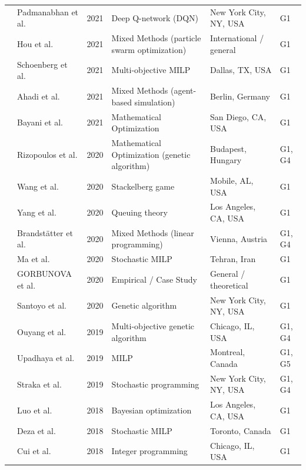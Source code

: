 \documentclass[letterpaper, 12pt, oneside, doublespacing]{Thesis}
\begin{document}
\begin{longtable}{L{0.9cm} L{2.2cm} L{0.8cm} L{3.3cm} L{2.5cm} L{1.5cm}}
\cite{optimal_placement_2021} & Padmanabhan et al. & 2021 & Deep Q-network (DQN) & New York City, NY, USA & G1 \\
\cite{optimal_planning_2021} & Hou et al. & 2021 & Mixed Methods (particle swarm optimization) & International {\slash} general & G1 \\
\cite{reducing_waiting_2021} & Schoenberg et al. & 2021 & Multi-objective MILP & Dallas, TX, USA & G1 \\
\cite{siting_and_2021} & Ahadi et al. & 2021 & Mixed Methods (agent-based simulation) & Berlin, Germany & G1 \\
\cite{strategic_competition_2021} & Bayani et al. & 2021 & Mathematical Optimization & San Diego, CA, USA & G1 \\
\cite{a_method_2020} & Rizopoulos et al. & 2020 & Mathematical Optimization (genetic algorithm) & Budapest, Hungary & G1, G4 \\
\cite{double-layer_game_2020} & Wang et al. & 2020 & Stackelberg game & Mobile, AL, USA & G1 \\
\cite{dynamic_modeling_2020} & Yang et al. & 2020 & Queuing theory & Los Angeles, CA, USA & G1 \\
\cite{location_of_2020} & Brandst\"atter et al. & 2020 & Mixed Methods (linear programming) & Vienna, Austria & G1, G4 \\
\cite{optimal_fast_2020} & Ma et al. & 2020 & Stochastic MILP & Tehran, Iran & G1 \\
\cite{optimizing_the_2020} & GORBUNOVA et al. & 2020 & Empirical / Case Study & General {\slash} theoretical & G1 \\
\cite{resource_aware_2020} & Santoyo et al. & 2020 & Genetic algorithm & New York City, NY, USA & G1 \\
\cite{a_method_2019} & Ouyang et al. & 2019 & Multi-objective genetic algorithm & Chicago, IL, USA & G1, G4 \\
\cite{optimal_decision_2019} & Upadhaya et al. & 2019 & MILP & Montreal, Canada & G1, G5 \\
\cite{predicting_popularity_2019} & Straka et al. & 2019 & Stochastic programming & New York City, NY, USA & G1, G4 \\
\cite{a_consumer_2018} & Luo et al. & 2018 & Bayesian optimization & Los Angeles, CA, USA & G1 \\
\cite{charging_station_2018} & Deza et al. & 2018 & Stochastic MILP & Toronto, Canada & G1 \\
\cite{electric_vehicle_2018} & Cui et al. & 2018 & Integer programming & Chicago, IL, USA & G1 \\

\end{longtable}
\end{document}
